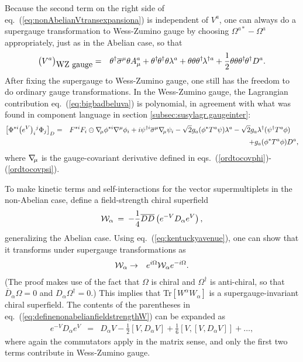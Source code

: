 \documentclass[11pt]{article}
\def\BDplus{+}
\def\thetasigmamuthetadagger{\theta\sigma^\mu\theta^\dagger}
\def\BDplus{-}
\def\thetasigmamuthetadagger{\theta^\dagger\sigmabar^\mu\theta}
\def\BDplus{\oplus}
\def\thetasigmamuthetadagger{\theta\sigma^\mu\theta^\dagger}
\def\BDplus{\ominus}
\def\thetasigmamuthetadagger{\theta^\dagger\sigmabar^\mu\theta}
\newcommand{\thdthd}{\theta^\dagger\hspace{-1pt}\theta^\dagger}
\newcommand{\nablasubmu}{\nabla\hspace{-2pt}{}_\mu}
\def\beq{\begin{eqnarray}}
\def\eeq{\end{eqnarray}}
\def\sigmabar{\overline\sigma}
\def\Dcon{\overline D}
\begin{document}
Because the second term on the right side of eq.~(\ref{eq:nonAbelianVtransexpansiona}) is  
independent of $V^a$, one can always do a supergauge transformation to Wess-Zumino gauge
by choosing $\Omega^{a*} - \Omega^a$ appropriately, 
just as in the
Abelian case, so that
\beq
\bigl (V^a \bigr )_{\mbox{WZ gauge}}
&=& 
\thetasigmamuthetadagger  A^a_\mu
+ \thdthd \theta \lambda^a 
+ \theta \theta  \theta^\dagger\hspace{-1pt} \lambda^{\dagger a} 
+ \frac{1}{2} \theta\theta\thdthd D^a .
\eeq
After fixing the supergauge to Wess-Zumino gauge, one still has the freedom to do ordinary
gauge transformations.
In the Wess-Zumino gauge, the Lagrangian contribution eq.~(\ref{eq:bigbadbeluva}) is polynomial,
in agreement with what was found in component language in section 
\ref{subsec:susylagr.gaugeinter}:
\beq
\left [ \Phi^{*i} \bigl (e^{V} \bigr )_i{}^j \Phi_j \right ]_D 
&=&
F^{*i} F_i 
\BDplus \nablasubmu \phi^{*i} \nabla^\mu \phi_i
+ i \psi^{\dagger i} \sigmabar^\mu \nablasubmu \psi_i
- \sqrt{2} g_a (\phi^{*} T^a \psi) \lambda^a 
- \sqrt{2} g_a \lambda^\dagger (\psi^{\dagger } T^a \phi)
\phantom{xx}
\nonumber \\ &&
+ g_a  (\phi^{*} T^a \phi) D^a,
\eeq 
where $\nablasubmu$ is the gauge-covariant derivative
defined in eqs.~(\ref{ordtocovphi})-(\ref{ordtocovpsi}).


To make kinetic terms and self-interactions for the vector 
supermultiplets in the non-Abelian case,
define a field-strength chiral superfield
\beq
{\cal W}_\alpha \>=\> -\frac{1}{4} \Dcon\Dcon 
\left (e^{-V} D_\alpha e^V \right),
\label{eq:definenonabelianfieldstrengthW}
\eeq
generalizing the Abelian case.
Using eq.~(\ref{eq:kentuckyavenue}), 
one can show that it transforms under supergauge transformations as
\beq
{\cal W}_\alpha &\rightarrow& e^{i\Omega} {\cal W}_\alpha e^{-i\Omega}
.
\eeq
(The proof makes use of the fact that $\Omega$ is chiral and $\Omega^\dagger$ is anti-chiral, so that $\Dcon_{\dot\alpha} \Omega = 0$
and $D_\alpha \Omega^\dagger = 0$.) This implies that Tr$[W^\alpha W_\alpha]$
is a supergauge-invariant chiral superfield.
The contents of the parentheses in 
eq.~(\ref{eq:definenonabelianfieldstrengthW}) can be expanded as 
\beq
e^{-V} D_\alpha e^V &=& D_\alpha V - \frac{1}{2} [V, D_\alpha V]
+ \frac{1}{6} \left [V, \left [V, D_\alpha V\right ] \right ] + \ldots ,
\eeq
where again the commutators apply in the matrix sense, and only the first two terms 
contribute in Wess-Zumino gauge.
\end{document}
